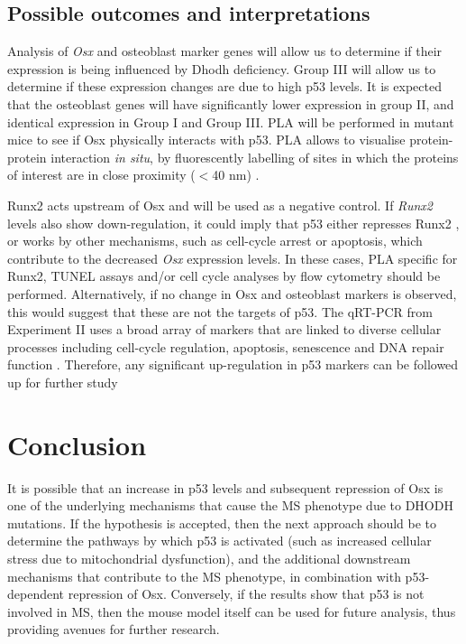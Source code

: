 \documentclass[12pt]{article}
\begin{document}
\subsection{Possible outcomes and interpretations}
Analysis of \textit{Osx} and osteoblast marker genes \citep{tang2011osteoblast} will allow us to determine if their expression is being influenced by Dhodh deficiency. Group III will allow us to determine if these expression changes are due to high p53 levels. It is expected that the osteoblast genes will have significantly lower expression in group II, and  identical expression in Group I and Group III.  
PLA will be performed in mutant mice to see if Osx physically interacts with p53. PLA allows to visualise protein-protein interaction \textit{in situ}, by fluorescently labelling of sites in which the proteins of interest are in close proximity ($<$40 nm) \citep{thymiakou2011detection}.

Runx2 acts upstream of Osx and will be used as a negative control. If \textit{Runx2} levels also show down-regulation,  it could imply that p53 either represses Runx2 \citep{ozaki2013runt}, or works by other mechanisms, such as cell-cycle arrest or apoptosis,  which contribute to the decreased \textit{Osx} expression levels. In these cases, PLA specific for Runx2, TUNEL assays and/or cell cycle analyses by flow cytometry should be performed. Alternatively, if no change in Osx and osteoblast markers is observed, this would suggest that these are not the targets of p53. The qRT-PCR from Experiment II uses a broad array of markers that are linked to diverse cellular processes including  cell-cycle regulation, apoptosis, senescence and DNA repair function \citep{levine1997p53}. Therefore, any significant up-regulation in p53 markers can be followed up for further study

\section{Conclusion}
It is possible that an increase in p53 levels and subsequent repression of Osx is one of the underlying mechanisms that cause the MS phenotype due to DHODH mutations. If the hypothesis is accepted, then the next approach should be to determine the pathways by which p53 is activated (such as increased cellular stress due to mitochondrial dysfunction), and the additional downstream mechanisms that contribute to the MS phenotype, in combination with p53-dependent repression of Osx. Conversely, if the results show that p53 is not involved in MS, then the mouse model itself can be used for future analysis, thus providing avenues for further research.
\end{document}
